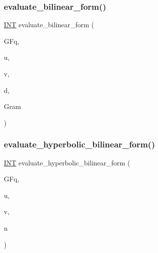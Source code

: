 \subsubsection{\texorpdfstring{evaluate\+\_\+bilinear\+\_\+form()}{evaluate\_bilinear\_form()}}
{\footnotesize\ttfamily \mbox{\hyperlink{galois_8h_a09fddde158a3a20bd2dcadb609de11dc}{I\+NT}} evaluate\+\_\+bilinear\+\_\+form (\begin{DoxyParamCaption}\item[{\mbox{\hyperlink{classfinite__field}{finite\+\_\+field}} \&}]{G\+Fq,  }\item[{\mbox{\hyperlink{galois_8h_a09fddde158a3a20bd2dcadb609de11dc}{I\+NT}} $\ast$}]{u,  }\item[{\mbox{\hyperlink{galois_8h_a09fddde158a3a20bd2dcadb609de11dc}{I\+NT}} $\ast$}]{v,  }\item[{\mbox{\hyperlink{galois_8h_a09fddde158a3a20bd2dcadb609de11dc}{I\+NT}}}]{d,  }\item[{\mbox{\hyperlink{galois_8h_a09fddde158a3a20bd2dcadb609de11dc}{I\+NT}} $\ast$}]{Gram }\end{DoxyParamCaption})}

\mbox{\label{_l_i_b_2_g_a_l_o_i_s_2orthogonal__points_8_c_aec8efeb197c11049202f4ee8bbd1c9c1}} 
\subsubsection{\texorpdfstring{evaluate\+\_\+hyperbolic\+\_\+bilinear\+\_\+form()}{evaluate\_hyperbolic\_bilinear\_form()}}
{\footnotesize\ttfamily \mbox{\hyperlink{galois_8h_a09fddde158a3a20bd2dcadb609de11dc}{I\+NT}} evaluate\+\_\+hyperbolic\+\_\+bilinear\+\_\+form (\begin{DoxyParamCaption}\item[{\mbox{\hyperlink{classfinite__field}{finite\+\_\+field}} \&}]{G\+Fq,  }\item[{\mbox{\hyperlink{galois_8h_a09fddde158a3a20bd2dcadb609de11dc}{I\+NT}} $\ast$}]{u,  }\item[{\mbox{\hyperlink{galois_8h_a09fddde158a3a20bd2dcadb609de11dc}{I\+NT}} $\ast$}]{v,  }\item[{\mbox{\hyperlink{galois_8h_a09fddde158a3a20bd2dcadb609de11dc}{I\+NT}}}]{n }\end{DoxyParamCaption})}

